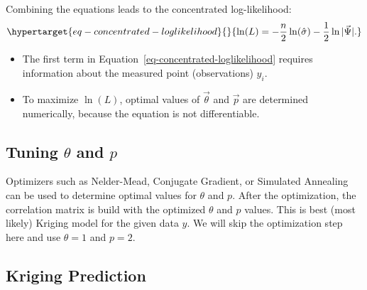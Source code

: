 \documentclass[
  letterpaper,
  DIV=11,
  numbers=noendperiod]{scrreprt}
\providecommand{\tightlist}{%
  \setlength{\itemsep}{0pt}\setlength{\parskip}{0pt}}\usepackage{longtable,booktabs,array}
\begin{document}
Combining the equations leads to the concentrated log-likelihood:
\begin{equation}\protect\hypertarget{eq-concentrated-loglikelihood}{}{\ln(L) = - \frac{n}{2} \ln(\hat{\sigma}) - \frac{1}{2} \ln |\vec{\Psi}|.}\label{eq-concentrated-loglikelihood}\end{equation}

\begin{tcolorbox}[enhanced jigsaw, opacityback=0, left=2mm, title=\textcolor{quarto-callout-note-color}{\faInfo}\hspace{0.5em}{Note: The Concentrated Log-Likelihood}, bottomrule=.15mm, titlerule=0mm, arc=.35mm, leftrule=.75mm, colbacktitle=quarto-callout-note-color!10!white, bottomtitle=1mm, opacitybacktitle=0.6, coltitle=black, colframe=quarto-callout-note-color-frame, toprule=.15mm, breakable, colback=white, toptitle=1mm, rightrule=.15mm]

\begin{itemize}
\tightlist
\item
  The first term in Equation~\ref{eq-concentrated-loglikelihood}
  requires information about the measured point (observations) \(y_i\).
\item
  To maximize \(\ln(L)\), optimal values of \(\vec{\theta}\) and
  \(\vec{p}\) are determined numerically, because the equation is not
  differentiable.
\end{itemize}

\end{tcolorbox}

\hypertarget{tuning-theta-and-p}{%
\subsection{\texorpdfstring{Tuning \(\theta\) and
\(p\)}{Tuning \textbackslash theta and p}}\label{tuning-theta-and-p}}

Optimizers such as Nelder-Mead, Conjugate Gradient, or Simulated
Annealing can be used to determine optimal values for \(\theta\) and
\(p\). After the optimization, the correlation matrix is build with the
optimized \(\theta\) and \(p\) values. This is best (most likely)
Kriging model for the given data \(y\). We will skip the optimization
step here and use \(\theta = 1\) and \(p=2\).

\hypertarget{kriging-prediction}{%
\subsection{Kriging Prediction}\label{kriging-prediction}}
\end{document}
